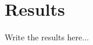 \def\baselinestretch{1}
\chapter{Results}
\label{chap:results}
\ifpdf
    \graphicspath{{Results/Figures/PNG/}{Results/Figures/PDF/}{Results/Figures/}}
\else
    \graphicspath{{Results/Figures/EPS/}{Results/Figures/}}
\fi

Write the results here...